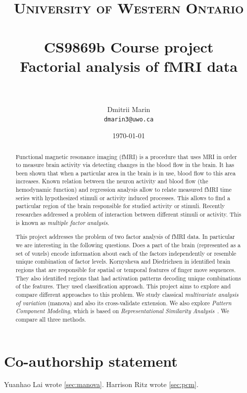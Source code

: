 \documentclass[paper=a4,fontsize=12pt]{scrartcl}
\title{	
\normalfont \normalsize 
\textsc{University of Western Ontario} \\ [25pt] %
\horrule{0.5pt} \\[0.4cm] %
\Large CS9869b Course project\\ \huge Factorial analysis of fMRI data  \\ %
\horrule{2pt} \\[0.5cm] %
}
\author{Dmitrii Marin \\ \small\tt dmarin3@uwo.ca} %
\date{\normalsize\today} %
\numberwithin{equation}{section} %
\numberwithin{figure}{section} %
\numberwithin{table}{section} %
\begin{document}
\maketitle %

\begin{abstract}

Functional magnetic resonance imaging (fMRI) is a procedure that uses MRI in order to measure brain activity via detecting changes in the blood flow in the brain. It has been shown that when a particular area in the brain is in use, blood flow to this area increases\cite{ogawa1990brain,shmuel2002sustained}. Known relation between the neuron activity and blood flow (the hemodynamic function) and regression analysis allow to relate measured fMRI time series with hypothesized stimuli or activity induced processes\cite{huettel2004functional}.  %
This allows to find a particular region of the brain responsible for studied activity or stimuli. Recently researches addressed a problem of interaction between different stimuli or activity. This is known as \emph{multiple factor analysis}.

This project addresses the problem of two factor analysis of fMRI data. In particular we are interesting in the following questions. Does a part of the brain (represented as a set of voxels) encode information about each of the factors independently or  resemble unique combination of factor levels. Kornysheva and Diedrichsen in \cite{Kornysheva2014} identified brain regions that are responsible for spatial or temporal features of finger move sequences. They also identified regions that had activation patterns decoding unique combinations of the features. They used classification approach. This project aims to explore and compare different approaches to this problem. We study classical \emph{multivariate analysis of variation} (manova) and also its cross-validate extension. We also explore \emph{Pattern Component Modeling}\cite{Walther2016}, which is based on \emph{Representational Similarity Analysis}~\cite{kriegeskorte2008representational}. We compare all three methods.


\end{abstract}

\newpage

\section*{Co-authorship statement}
Yuanhao Lai wrote \cref{sec:manova}. Harrison Ritz wrote \cref{sec:pcm}. 
\end{document}
